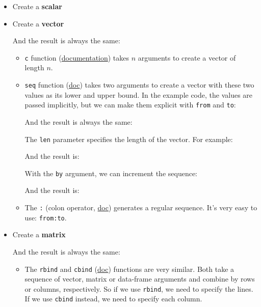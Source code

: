 \documentclass[a4paper]{article}
\begin{document}
    \begin{itemize}
        \item Create a \textbf{scalar}
        

        \item Create a \textbf{vector}
        
        And the result is always the same:
        
        \begin{itemize}
            \item \texttt{c} function (\href{https://www.rdocumentation.org/packages/base/versions/3.6.2/topics/c}{documentation}) takes $n$ arguments to create a vector of length $n$.

            \item \texttt{seq} function (\href{https://www.rdocumentation.org/packages/base/versions/3.6.2/topics/seq}{doc}) takes two arguments to create a vector with these two values as its lower and upper bound. In the example code, the values are passed implicitly, but we can make them explicit with \texttt{from} and \texttt{to}:
            
            And the result is always the same:
            
            The \texttt{len} parameter specifies the length of the vector. For example:
            
            And the result is:
            
            With the \texttt{by} argument, we can increment the sequence:
            
            And the result is:
            

            \item The \texttt{:} (colon operator, \href{https://www.rdocumentation.org/packages/base/versions/3.6.2/topics/Colon}{doc}) generates a regular sequence. It's very easy to use: \texttt{from:to}.
        \end{itemize}

        \item Create a \textbf{matrix}
        
        And the result is always the same:
        
        \begin{itemize}
            \item The \texttt{rbind} and \texttt{cbind} (\href{https://www.rdocumentation.org/packages/base/versions/3.6.2/topics/cbind}{doc}) functions are very similar. Both take a sequence of vector, matrix or data-frame arguments and combine by rows or columns, respectively. So if we use \texttt{rbind}, we need to specify the lines. If we use \texttt{cbind} instead, we need to specify each column.
            

\end{itemize}
\end{itemize}
\end{document}
